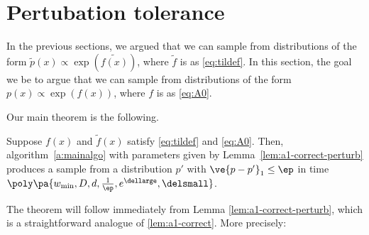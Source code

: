 \section{Pertubation tolerance} \label{sec:perturb}

In the previous sections, we argued that we can sample from distributions of the form $\tilde{p}(x) \propto \exp(\tilde{f(x)})$, where $\tilde{f}$ is as \eqref{eq:tildef}. In this section, the goal we be to argue that we can sample from distributions of the form $p(x) \propto \exp(f(x))$, where $f$ is as \eqref{eq:A0}. 

Our main theorem is the following. 
\begin{thm}\label{thm:main-perturb}
Suppose $f(x)$ and $\tilde{f}(x)$ satisfy \eqref{eq:tildef} and \eqref{eq:A0}. Then, algorithm~\ref{a:mainalgo} with parameters given by Lemma~\ref{lem:a1-correct-perturb} produces a sample from a distribution $p'$ with $\ve{p-p'}_1\le \ep$ in time $\poly\pa{w_{\min}, D, d, \frac{1}{\ep}, e^{\dellarge}, \delsmall}$.
\end{thm}

The theorem will follow immediately from Lemma \ref{lem:a1-correct-perturb}, which is a straightforward analogue of \ref{lem:a1-correct}. More precisely: 

